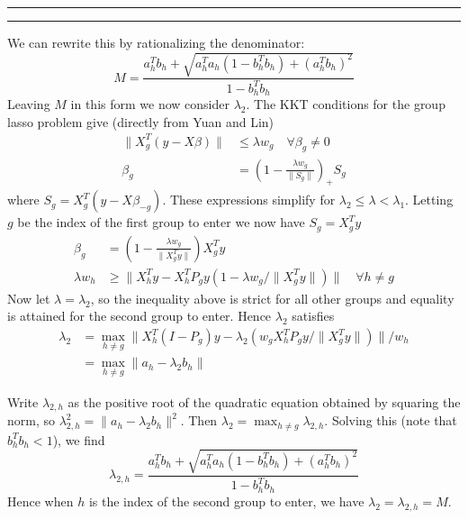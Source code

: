 \documentclass{imsart}
\newcommand{\norm}[1]{\lVert #1 \rVert}
\begin{document}
\hrule
\hrule
We can rewrite this by rationalizing the denominator:
\[
M =
\frac
{ a_h^T b_h +  \sqrt{ a_h^T a_h (1-b_h^Tb_h) + (a_h^T b_h)^2 }  }
{ 1-b_h^Tb_h }
\]
Leaving $M$ in this form we now consider $\lambda_2$. The KKT conditions for the group lasso problem give (directly from Yuan and Lin)
\begin{align*}
\norm{ X_g^T(y - X \beta) } & \leq \lambda w_g \quad \forall \beta_g \neq 0 \\
\beta_g & = \left( 1 - \frac{ \lambda w_g }{ \norm{S_g} } \right)_+ S_g
\end{align*}
where $S_g = X_g^T(y - X \beta_{-g})$. These expressions simplify for $\lambda_2 \leq \lambda < \lambda_1$. Letting $g$ be the index of the first group to enter we now have $S_g = X_g^Ty$ 
\begin{align*}
\beta_g & = \left( 1 - \frac{ \lambda w_g }{ \norm{X_g^Ty} } \right) X_g^Ty \\
\lambda w_h & \geq \norm{ X_h^Ty - X_h^T P_g y (1-\lambda w_g / \norm{X_g^Ty})  } \quad \forall h \neq g
\end{align*}
Now let $\lambda = \lambda_2$, so the inequality above is strict for all other groups and equality is attained for the second group to enter. Hence $\lambda_2$ satisfies
\begin{align*}
\lambda_2 & = \max_{h \neq g} 
\norm{ X_h^T(I - P_g) y - \lambda_2 ( w_g X_h^T P_g y / \norm{X_g^Ty} )  } / w_h\\
& = \max_{h \neq g} \norm{ a_h - \lambda_2 b_h } 
\end{align*}

Write $\lambda_{2,h}$ as the positive root of the quadratic equation obtained by squaring the norm, so $\lambda_{2,h}^2 = \norm{ a_h - \lambda_2 b_h }^2$. Then $\lambda_2 = \max_{h \neq g} \lambda_{2,h}$. Solving this (note that $b_h^Tb_h < 1$), we find
\[
\lambda_{2,h} = \frac
{ a_h^T b_h +  \sqrt{ a_h^T a_h (1-b_h^Tb_h) + (a_h^T b_h)^2 }  }
{ 1-b_h^Tb_h }
\]
Hence when $h$ is the index of the second group to enter, we have $\lambda_2 = \lambda_{2,h} = M$.



%

\end{document}
